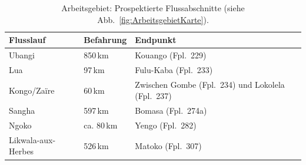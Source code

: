 \begin{table}[t]
\centering
{\small \begin{tabular}{@{}p{}R{.11\textwidth}p{.5\textwidth}@{}}
\toprule
\textbf{Flusslauf} & \textbf{Befahrung} & \textbf{Endpunkt} \\
\midrule
Ubangi & 850\,km & Kouango (Fpl.~229) \\
Lua & 97\,km & Fulu-Kaba (Fpl.~233) \\
Kongo/Za{\"i}re & 60\,km & Zwischen Gombe (Fpl.~234) und Lokolela (Fpl.~237) \\
Sangha & 597\,km & Bomasa (Fpl.~274a) \\
Ngoko & ca. 80\,km & Yengo (Fpl.~282)\\
Likwala-aux-Herbes & 526\,km & Matoko (Fpl.~307) \\
\bottomrule
\end{tabular}}
\caption{Arbeitsgebiet: Prospektierte Flussabschnitte (siehe Abb.~\ref{fig:ArbeitsgebietKarte}).}
\label{tab:ArbeitsgebietFlussstrecken}
\end{table}

